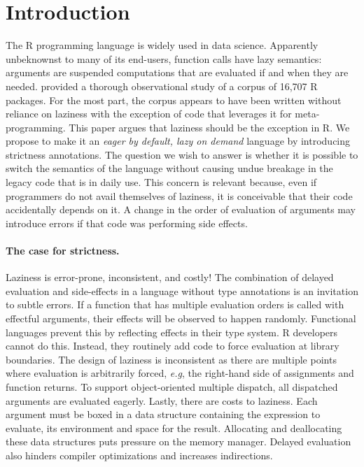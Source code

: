 \documentclass[review,nonacm,screen,acmsmall,anonymous=true]{acmart}
\begin{document}


\maketitle
\section{Introduction}

The R programming language is widely used in data science. Apparently
unbeknownst to many of its end-users, function calls have lazy semantics:
arguments are suspended computations that are evaluated if and when they are
needed. \citet{oopsla19b} provided a thorough observational study of a corpus of
16,707 R packages. For the most part, the corpus appears to have been written
without reliance on laziness with the exception of code that leverages it for
meta-programming. This paper argues that laziness should be the exception in R.
We propose to make it an \emph{eager by default, lazy on demand} language by
introducing strictness annotations. The question we wish to answer is whether it
is possible to switch the semantics of the language without causing undue
breakage in the legacy code that is in daily use. This concern is relevant
because, even if programmers do not avail themselves of laziness, it is
conceivable that their code accidentally depends on it. A change in the order of
evaluation of arguments may introduce errors if that code was performing side
effects.

\paragraph{The case for strictness.} Laziness is error-prone, inconsistent,
and costly! The combination of delayed evaluation and side-effects in a language
without type annotations is an invitation to subtle errors. If a function that
has multiple evaluation orders is called with effectful arguments, their effects
will be observed to happen randomly. Functional languages prevent this by reflecting
effects in their type system. R developers cannot do this. Instead, they
routinely add code to force evaluation at library boundaries. The design
of laziness is inconsistent as there are multiple points where evaluation
is arbitrarily forced, \emph{e.g}, the right-hand side of assignments and function
returns. To support object-oriented multiple dispatch, all dispatched arguments
are evaluated eagerly. Lastly, there are costs to laziness. Each argument must be
boxed in a data structure containing the expression to evaluate, its environment and
space for the result. Allocating and deallocating these data structures puts
pressure on the memory manager. Delayed evaluation also hinders compiler
optimizations and increases indirections.
\end{document}
